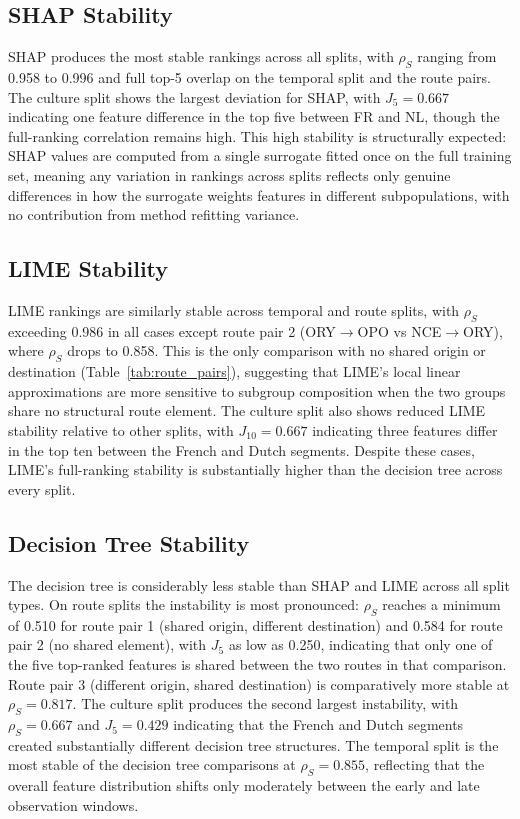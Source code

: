\documentclass[oneside]{memoir} %
\begin{document}


\subsection{SHAP Stability}

SHAP produces the most stable rankings across all splits, with $\rho_S$ ranging from 0.958 to 0.996 and full top-5 overlap on the temporal split and the route pairs. The culture split shows the largest deviation for SHAP, with $J_5 = 0.667$ indicating one feature difference in the top five between FR and NL, though the full-ranking correlation remains high. This high stability is structurally expected: SHAP values are computed from a single surrogate fitted once on the full training set, meaning any variation in rankings across splits reflects only genuine differences in how the surrogate weights features in different subpopulations, with no contribution from method refitting variance.

\subsection{LIME Stability}
LIME rankings are similarly stable across temporal and route splits, with $\rho_S$ exceeding 0.986 in all cases except route pair 2 (ORY$\to$OPO vs NCE$\to$ORY), where $\rho_S$ drops to 0.858. This is the only comparison with no shared origin or destination (Table~\ref{tab:route_pairs}), suggesting that LIME's local linear approximations are more sensitive to subgroup composition when the two groups share no structural route element. The culture split also shows reduced LIME stability relative to other splits, with $J_{10} = 0.667$ indicating three features differ in the top ten between the French and Dutch segments. Despite these cases, LIME's full-ranking stability is substantially higher than the decision tree across every split.

\subsection{Decision Tree Stability}

The decision tree is considerably less stable than SHAP and LIME across all split types. On route splits the instability is most pronounced: $\rho_S$ reaches a minimum of 0.510 for route pair 1 (shared origin, different destination) and 0.584 for route pair 2 (no shared element), with $J_5$ as low as 0.250, indicating that only one of the five top-ranked features is shared between the two routes in that comparison. Route pair 3 (different origin, shared destination) is comparatively more stable at $\rho_S = 0.817$. The culture split produces the second largest instability, with $\rho_S = 0.667$ and $J_5 = 0.429$ indicating that the French and Dutch segments created substantially different decision tree structures. The temporal split is the most stable of the decision tree comparisons at $\rho_S = 0.855$, reflecting that the overall feature distribution shifts only moderately between the early and late observation windows.
\end{document}
